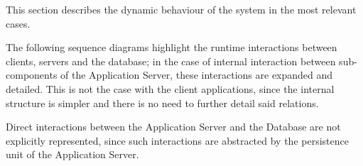This section describes the dynamic behaviour of the system in the most relevant cases.

The following sequence diagrams highlight the runtime interactions between clients, servers and the database; in the case of internal interaction between sub-components of the Application Server, these interactions are expanded and detailed. This is not the case with the client applications, since the internal structure is simpler and there is no need to further detail said relations.

Direct interactions between the Application Server and the Database are not explicitly represented, since such interactions are abstracted by the persistence unit of the Application Server.

